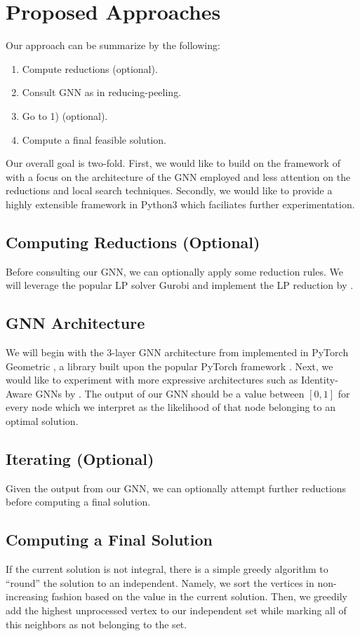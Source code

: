 \documentclass{article}
\begin{document}
\section{Proposed Approaches}
Our approach can be summarize by the following:
\begin{enumerate}[1)]
  \item Compute reductions (optional).
  \item Consult GNN as in reducing-peeling.
  \item Go to 1) (optional).
  \item Compute a final feasible solution.
\end{enumerate}
Our overall goal is two-fold.
First, we would like to build on the framework of \citet{langedal_et_al}
with a focus on the architecture of the GNN employed
and less attention on the reductions and local search techniques.
Secondly, we would like to provide a highly extensible framework in Python3
which faciliates further experimentation.

\subsection{Computing Reductions (Optional)}
Before consulting our GNN,
we can optionally apply some reduction rules.
We will leverage the popular LP solver Gurobi \citet{gurobi}
and implement the LP reduction by \citet{lpreduction}.

\subsection{GNN Architecture}
We will begin with the 3-layer GNN architecture from \citet{langedal_et_al}
implemented in PyTorch Geometric \citet{pyg},
a library built upon the popular PyTorch framework \citet{pytorch}.
Next, we would like to experiment with more expressive architectures
such as Identity-Aware GNNs by \citet{idgnn}.
The output of our GNN should be a value between $[0, 1]$ for every node
which we interpret as the likelihood of that node belonging to an optimal solution.

\subsection{Iterating (Optional)}
Given the output from our GNN,
we can optionally attempt further reductions before computing a final solution.

\subsection{Computing a Final Solution}
If the current solution is not integral,
there is a simple greedy algorithm to ``round'' the solution to an independent.
Namely, we sort the vertices in non-increasing fashion based on the value in the current solution.
Then, we greedily add the highest unprocessed vertex to our independent set
while marking all of this neighbors as not belonging to the set.
\end{document}
